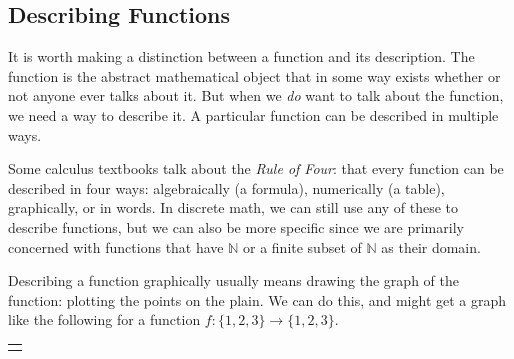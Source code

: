 \documentclass[10pt,]{book}
\theoremstyle{plain}
\theoremstyle{definition}
\theoremstyle{definition}
\theoremstyle{definition}
\numberwithin{equation}{chapter}
\newlength{\panelmax}
\def\N{\mathbb N}
\begin{document}
\subsection[{Describing Functions}]{Describing Functions}\label{subsection-51}
\hypertarget{p-2089}{}%
It is worth making a distinction between a function and its description.  The function is the abstract mathematical object that in some way exists whether or not anyone ever talks about it.  But when we \emph{do} want to talk about the function, we need a way to describe it.  A particular function can be described in multiple ways.%
\par
\hypertarget{p-2090}{}%
Some calculus textbooks talk about the \emph{Rule of Four}: that every function can be described in four ways: algebraically (a formula), numerically (a table), graphically, or in words.  In discrete math, we can still use any of these to describe functions, but we can also be more specific since we are primarily concerned with functions that have \(\N\) or a finite subset of \(\N\) as their domain.%
\par
\hypertarget{p-2091}{}%
Describing a function graphically usually means drawing the graph of the function: plotting the points on the plain. We can do this, and might get a graph like the following for a function \(f:\{1,2,3\} \to \{1,2,3\}\).%
{%
\setlength{\panelmax}{0pt}
\ifdefined\panelboxAimage\else\newsavebox{\panelboxAimage}\fi%
\begin{lrbox}{\panelboxAimage}
\end{lrbox}
\ifdefined\phAimage\else\newlength{\phAimage}\fi%
\setlength{\phAimage}{\ht\panelboxAimage+\dp\panelboxAimage}
\settototalheight{\phAimage}{\usebox{\panelboxAimage}}
\setlength{\panelmax}{\maxof{\panelmax}{\phAimage}}
\leavevmode%
\setlength{\tabcolsep}{0\linewidth}
\par\medskip\noindent
\hspace*{0.35\linewidth}%
\begin{tabular}{@{}*{1}{c}@{}}
\begin{minipage}[c][\panelmax][t]{0.3\linewidth}\usebox{\panelboxAimage}\end{minipage}\end{tabular}\\
}%
\end{document}
